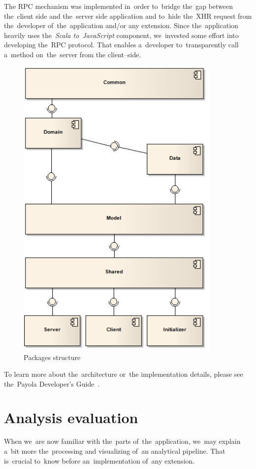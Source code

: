 The RPC mechanism was implemented in~order to~bridge the~gap between the~client 
side and the~server side application and to~hide the~XHR request from
the~developer of~the~application and/or any extension. Since the~application heavily
uses the~\emph{Scala to~JavaScript} component, we~invested some effort into developing the~RPC 
protocol. That enables a~developer to~transparently call a~method on~the~server from 
the client--side. 

\begin{figure}
	\centering
	\includegraphics[width=100mm]{images/project_dependencies.png}
	\caption{Packages structure}
	\label{fig:packages-structure}
\end{figure}

To learn more about the~architecture or~the implementation details, please see the~Payola Developer's Guide~\cite{payola:dg}.

\section{Analysis evaluation}
When we~are now familiar with the~parts of~the~application, we~may explain a~bit more the~processing and visualizing of~an analytical pipeline. That is~crucial to~know before an~implementation of~any extension.

